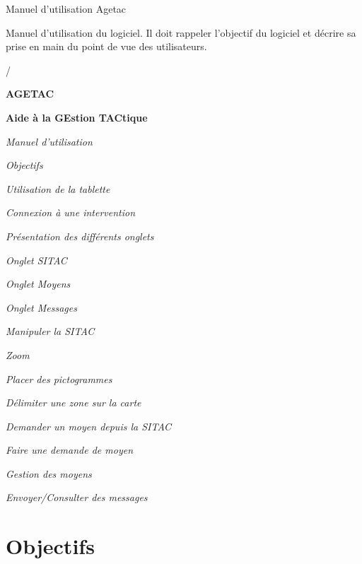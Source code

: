 \documentclass{article}
\begin{document}
\baselineskip=13pt
{\color{color01} Manuel d'utilisation Agetac}

{\color{color02} Manuel d'utilisation du logiciel. Il doit rappeler l'objectif 
du logiciel et décrire sa prise en main du point de vue des utilisateurs.}

{\color{color01} /\label{h.xupysk46i152}}

\vspace{37pt}
\begin{center}
{\Huge {\color{color01} \textbf{AGETAC\label{h.lo44xd8kik60}}}}

\vspace{24pt}
{\Huge {\color{color01} \textbf{Aide à la GEstion TACtique\label{h.roartwdftvws}}}}

\vspace{59pt}
{\huge {\color{color02} \textit{Manuel d'utilisation}}}
\end{center}

\vspace{372pt}
\leftskip=18pt
{\color{color04} \emph{Objectifs}}

{\color{color04} \emph{Utilisation de la tablette}}

\leftskip=36pt
{\color{color04} \emph{Connexion à une intervention}}

{\color{color04} \emph{Présentation des différents onglets}}

\leftskip=54pt
{\color{color04} \emph{Onglet SITAC}}

{\color{color04} \emph{Onglet Moyens}}

{\color{color04} \emph{Onglet Messages}}

\leftskip=36pt
{\color{color04} \emph{Manipuler la SITAC}}

\leftskip=54pt
{\color{color04} \emph{Zoom}}

{\color{color04} \emph{Placer des pictogrammes}}

{\color{color04} \emph{Délimiter une zone sur la carte}}

{\color{color04} \emph{Demander un moyen depuis la SITAC}}

\leftskip=36pt
{\color{color04} \emph{Faire une demande de moyen}}

{\color{color04} \emph{Gestion des moyens}}

{\color{color04} \emph{Envoyer/Consulter des messages\label{h.i0r3242knjin}}}

\vspace{341pt}
\section*{{\LARGE {\color{color01} \textbf{Objectifs}}}}
\end{document}
